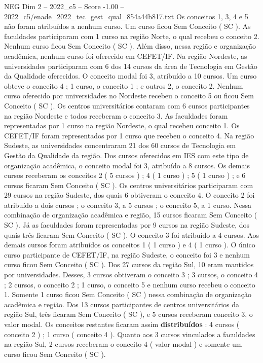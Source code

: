 \begin{textsample}{NEG Dim 2 – 2022\_c5 – Score -1.00 – 2022\_c5/enade\_2022\_tec\_gest\_qual\_854a44b817.txt}
Os conceitos 1, 3, 4 e 5 não foram atribuídos a nenhum curso.
Um curso ficou Sem Conceito ( SC ).
As faculdades participaram com 1 curso na região Norte, o qual recebeu o conceito 2.
Nenhum curso ficou Sem Conceito ( SC ).
Além disso, nessa região e organização acadêmica, nenhum curso foi oferecido em CEFET/IF.
Na região Nordeste, as universidades participaram com 6 dos 14 cursos da área de Tecnologia em Gestão da Qualidade oferecidos.
O conceito modal foi 3, atribuído a 10 cursos.
Um curso obteve o conceito 4 ; 1 curso, o conceito 1 ; e outros 2, o conceito 2.
Nenhum curso oferecido por universidades no Nordeste recebeu o conceito 5 ou ficou Sem Conceito ( SC ).
Os centros universitários contaram com 6 cursos participantes na região Nordeste e todos receberam o conceito 3.
As faculdades foram representadas por 1 curso na região Nordeste, o qual recebeu conceito 1.
Os CEFET/IF foram representados por 1 curso que recebeu o conceito 4.
Na região Sudeste, as universidades concentraram 21 dos 60 cursos de Tecnologia em Gestão da Qualidade da região.
Dos cursos oferecidos em IES com este tipo de organização acadêmica, o conceito modal foi 3, atribuído a 8 cursos.
Os demais cursos receberam os conceitos 2 ( 5 cursos ) ; 4 ( 1 curso ) ; 5 ( 1 curso ) ; e 6 cursos ficaram Sem Conceito ( SC ).
Os centros universitários participaram com 29 cursos na região Sudeste, dos quais 6 obtiveram o conceito 4.
O conceito 2 foi atribuído a dois cursos ; o conceito 3, a 5 cursos ; o conceito 5, a 1 curso.
Nessa combinação de organização acadêmica e região, 15 cursos ficaram Sem Conceito ( SC ).
Já as faculdades foram representadas por 9 cursos na região Sudeste, dos quais três ficaram Sem Conceito ( SC ).
O conceito 3 foi atribuído a 4 cursos.
Aos demais cursos foram atribuídos os conceitos 1 ( 1 curso ) e 4 ( 1 curso ).
O único curso participante de CEFET/IF, na região Sudeste, o conceito foi 3 e nenhum curso ficou Sem Conceito ( SC ).
Dos 27 cursos da região Sul, 10 eram mantidos por universidades.
Desses, 3 cursos obtiveram o conceito 3 ; 3 cursos, o conceito 4 ; 2 cursos, o conceito 2 ; 1 curso, o conceito 5 e nenhum curso recebeu o conceito 1.
Somente 1 curso ficou Sem Conceito ( SC ) nessa combinação de organização acadêmica e região.
Dos 13 cursos participantes de centros universitários da região Sul, três ficaram Sem Conceito ( SC ), e 5 cursos receberam conceito 3, o valor modal.
Os conceitos restantes ficaram assim \textbf{distribuídos} : 4 cursos ( conceito 2 ) ; 1 curso ( conceito 4 ).
Quanto aos 3 cursos vinculados a faculdades na região Sul, 2 cursos receberam o conceito 4 ( valor modal ) e somente um curso ficou Sem Conceito ( SC ).

\end{textsample}
